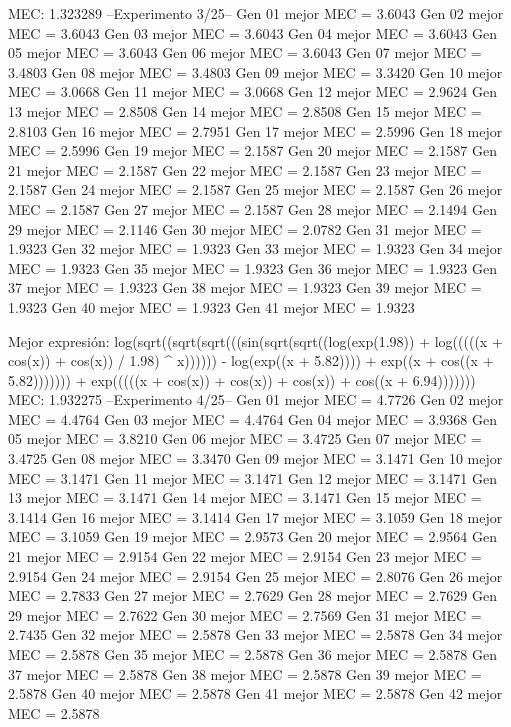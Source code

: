 MEC: 1.323289
--Experimento 
 3/25--
Gen 01 mejor MEC = 3.6043
Gen 02 mejor MEC = 3.6043
Gen 03 mejor MEC = 3.6043
Gen 04 mejor MEC = 3.6043
Gen 05 mejor MEC = 3.6043
Gen 06 mejor MEC = 3.6043
Gen 07 mejor MEC = 3.4803
Gen 08 mejor MEC = 3.4803
Gen 09 mejor MEC = 3.3420
Gen 10 mejor MEC = 3.0668
Gen 11 mejor MEC = 3.0668
Gen 12 mejor MEC = 2.9624
Gen 13 mejor MEC = 2.8508
Gen 14 mejor MEC = 2.8508
Gen 15 mejor MEC = 2.8103
Gen 16 mejor MEC = 2.7951
Gen 17 mejor MEC = 2.5996
Gen 18 mejor MEC = 2.5996
Gen 19 mejor MEC = 2.1587
Gen 20 mejor MEC = 2.1587
Gen 21 mejor MEC = 2.1587
Gen 22 mejor MEC = 2.1587
Gen 23 mejor MEC = 2.1587
Gen 24 mejor MEC = 2.1587
Gen 25 mejor MEC = 2.1587
Gen 26 mejor MEC = 2.1587
Gen 27 mejor MEC = 2.1587
Gen 28 mejor MEC = 2.1494
Gen 29 mejor MEC = 2.1146
Gen 30 mejor MEC = 2.0782
Gen 31 mejor MEC = 1.9323
Gen 32 mejor MEC = 1.9323
Gen 33 mejor MEC = 1.9323
Gen 34 mejor MEC = 1.9323
Gen 35 mejor MEC = 1.9323
Gen 36 mejor MEC = 1.9323
Gen 37 mejor MEC = 1.9323
Gen 38 mejor MEC = 1.9323
Gen 39 mejor MEC = 1.9323
Gen 40 mejor MEC = 1.9323
Gen 41 mejor MEC = 1.9323

Mejor expresión: log(sqrt((sqrt(sqrt(((sin(sqrt(sqrt((log(exp(1.98)) + log(((((x + cos(x)) + cos(x)) / 1.98) ^ x)))))) - log(exp((x + 5.82)))) + exp((x + cos((x + 5.82))))))) + exp(((((x + cos(x)) + cos(x)) + cos(x)) + cos((x + 6.94)))))))
MEC: 1.932275
--Experimento 
 4/25--
Gen 01 mejor MEC = 4.7726
Gen 02 mejor MEC = 4.4764
Gen 03 mejor MEC = 4.4764
Gen 04 mejor MEC = 3.9368
Gen 05 mejor MEC = 3.8210
Gen 06 mejor MEC = 3.4725
Gen 07 mejor MEC = 3.4725
Gen 08 mejor MEC = 3.3470
Gen 09 mejor MEC = 3.1471
Gen 10 mejor MEC = 3.1471
Gen 11 mejor MEC = 3.1471
Gen 12 mejor MEC = 3.1471
Gen 13 mejor MEC = 3.1471
Gen 14 mejor MEC = 3.1471
Gen 15 mejor MEC = 3.1414
Gen 16 mejor MEC = 3.1414
Gen 17 mejor MEC = 3.1059
Gen 18 mejor MEC = 3.1059
Gen 19 mejor MEC = 2.9573
Gen 20 mejor MEC = 2.9564
Gen 21 mejor MEC = 2.9154
Gen 22 mejor MEC = 2.9154
Gen 23 mejor MEC = 2.9154
Gen 24 mejor MEC = 2.9154
Gen 25 mejor MEC = 2.8076
Gen 26 mejor MEC = 2.7833
Gen 27 mejor MEC = 2.7629
Gen 28 mejor MEC = 2.7629
Gen 29 mejor MEC = 2.7622
Gen 30 mejor MEC = 2.7569
Gen 31 mejor MEC = 2.7435
Gen 32 mejor MEC = 2.5878
Gen 33 mejor MEC = 2.5878
Gen 34 mejor MEC = 2.5878
Gen 35 mejor MEC = 2.5878
Gen 36 mejor MEC = 2.5878
Gen 37 mejor MEC = 2.5878
Gen 38 mejor MEC = 2.5878
Gen 39 mejor MEC = 2.5878
Gen 40 mejor MEC = 2.5878
Gen 41 mejor MEC = 2.5878
Gen 42 mejor MEC = 2.5878


